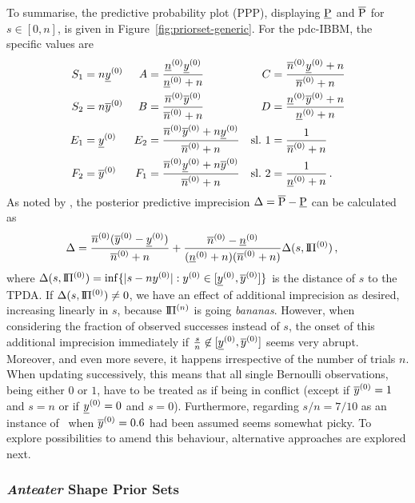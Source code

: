 To summarise, the predictive probability plot (PPP),
displaying $\underline{\operatorname{P}}$ and $\overline{\operatorname{P}}$ for $s \in [0, n]$,
is given in Figure~\ref{fig:priorset-generic}.
For the pdc-IBBM, the specific values are
\begin{align*}
S_1 &= n\underline{y}^{(0)} &
A   &= \frac{\underline{n}^{(0)} \underline{y}^{(0)}}{\underline{n}^{(0)} + n} & 
C   &= \frac{\overline{n}^{(0)} \underline{y}^{(0)} + n}{\overline{n}^{(0)} + n} \\
S_2 &= n\overline{y}^{(0)} &
B   &= \frac{\overline{n}^{(0)} \overline{y}^{(0)}}{\overline{n}^{(0)} + n} & 
D   &= \frac{\underline{n}^{(0)} \overline{y}^{(0)} + n}{\underline{n}^{(0)} + n} \\
E_1 &= \underline{y}^{(0)} &
E_2 &= \frac{\overline{n}^{(0)} \overline{y}^{(0)} + n \underline{y}^{(0)}}{\overline{n}^{(0)} + n} &
\text{sl.~1} &= \frac{1}{\overline{n}^{(0)} + n} \\
F_2 &= \overline{y}^{(0)} &
F_1 &= \frac{\overline{n}^{(0)} \underline{y}^{(0)} + n \overline{y}^{(0)}}{\overline{n}^{(0)} + n} &
\text{sl.~2} &= \frac{1}{\underline{n}^{(0)} + n} \,.
\end{align*}
As noted by \textcite[p.~224]{1991:walley}, the posterior predictive imprecision $\Delta = \overline{\operatorname{P}} - \underline{\operatorname{P}}$ can be calculated as
\begin{align*}
\Delta &= \frac{\overline{n}^{(0)} (\overline{y}^{(0)} - \underline{y}^{(0)})}{\overline{n}^{(0)} + n} + \frac{\overline{n}^{(0)} - \underline{n}^{(0)}}{(\underline{n}^{(0)} + n)(\overline{n}^{(0)} + n)} \Delta(s, \text{I}\!\Pi^{(0)})\,,
\end{align*}
where $\Delta(s, \text{I}\!\Pi^{(0)}) = \inf\{ |s - n y^{(0)}| : y^{(0)} \in [\underline{y}^{(0)}, \overline{y}^{(0)}] \}$ is the distance of
$s$ to the TPDA.
If $\Delta(s, \text{I}\!\Pi^{(0)}) \neq 0$, we have an effect of additional imprecision as desired,
increasing linearly in $s$, because $\text{I}\!\Pi^{(n)}$ is going \emph{bananas}.
However, when considering the fraction of observed successes instead
of $s$, the onset of this additional imprecision immediately if
$\frac{s}{n} \not\in [\underline{y}^{(0)}, \overline{y}^{(0)}]$ seems very abrupt. Moreover, and even more severe,
it happens irrespective of the number of trials $n$. When updating successively, this means that all single
Bernoulli observations, being either $0$ or $1$, have to be treated as if being in conflict
(except if $\overline{y}^{(0)} = 1$ and $s=n$ or if $\underline{y}^{(0)} = 0$ and $s=0$). Furthermore, regarding $s/n = 7/10$ %
as an instance of \pdc\ when $\overline{y}^{(0)} = 0.6$ had been assumed seems somewhat picky.
To explore possibilities to amend this behaviour, alternative
approaches are explored next.


\subsubsection{\emph{Anteater} Shape Prior Sets}
\label{sec:othershapes}

